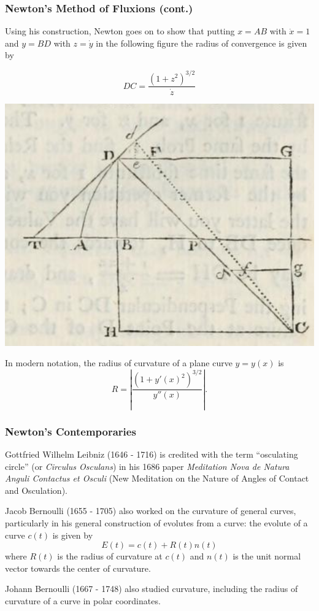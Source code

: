\documentclass{beamer}
\newcommand{\abs}[1]{\left|#1\right|}
\theoremstyle{definition}
\begin{document}
\begin{frame}
    \frametitle{Newton's Method of Fluxions (cont.)}

    Using his construction, Newton goes on to show that putting $x = AB$ with
    $\dot{x} = 1$ and $y = BD$ with $z = \dot{y}$ in the following figure \cite{newton}
    the radius of convergence is given by
    \begin{minipage}{.49\textwidth}
        \[
            DC = \dfrac{(1+z^2)^{3/2}}{\dot{z}}
        \]
    \end{minipage}
    \begin{minipage}{.49\textwidth}
        \centering
        \includegraphics[width=.8\textwidth]{images/newton-formula-derivation.png}
    \end{minipage}
    In modern notation, the radius of curvature of a plane curve $y = y(x)$ is
    \[
        R = \abs{\frac{(1+y'(x)^2)^{3/2}}{y''(x)}}.
    \]
\end{frame}

\begin{frame}
    \frametitle{Newton's Contemporaries}

    Gottfried Wilhelm Leibniz (1646 - 1716) is credited with the term ``osculating circle''
    (or \emph{Circulus Osculans}) in his 1686 paper \textit{Meditation Nova de Natura Anguli
    Contactus et Osculi} (New Meditation on the Nature of Angles of Contact and Osculation).
    \cite{unsat-hist}\cite{geom-diff-view}

    Jacob Bernoulli (1655 - 1705) also worked on the curvature of general
    curves, particularly in his general construction of evolutes from a curve:
    the evolute of a curve $c(t)$ is given by
    \[
        E(t) = c(t) + R(t)n(t)
    \]
    where $R(t)$ is the radius of curvature at $c(t)$ and $n(t)$ is the unit normal
    vector towards the center of curvature.

    Johann Bernoulli (1667 - 1748) also studied curvature, including the radius of curvature
    of a curve in polar coordinates.

\end{frame}
\end{document}
